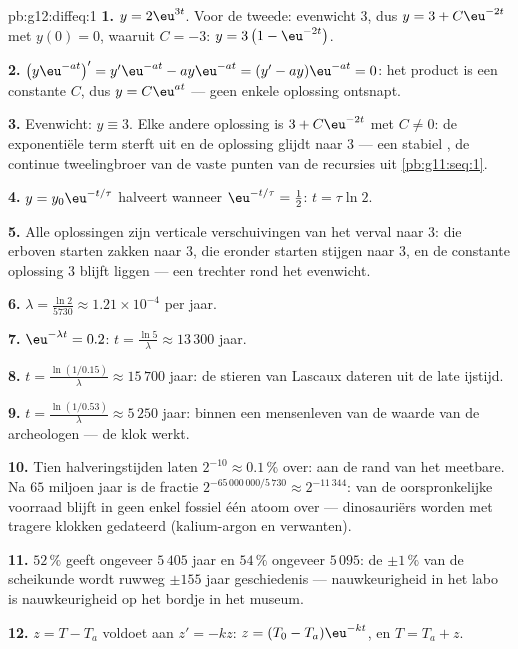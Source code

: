 \begin{solution}{pb:g12:diffeq:1}
\textbf{1.} $y = 2\eu^{3t}$. Voor de tweede: evenwicht $3$, dus
$y = 3 + C\eu^{-2t}$ met $y(0) = 0$, waaruit $C = -3$:
$y = 3\left(1 - \eu^{-2t}\right)$.

\textbf{2.} $\left(y\eu^{-at}\right)' = y'\eu^{-at} - ay\eu^{-at} =
(y' - ay)\eu^{-at} = 0$: het product is een constante $C$, dus
$y = C\eu^{at}$ --- geen enkele oplossing ontsnapt.

\textbf{3.} Evenwicht: $y \equiv 3$. Elke andere oplossing is
$3 + C\eu^{-2t}$ met $C \neq 0$: de exponentiële term sterft uit en de
oplossing glijdt naar $3$ --- een stabiel , de continue tweelingbroer
van de vaste punten van de recursies uit \cref{pb:g11:seq:1}.

\textbf{4.} $y = y_0\eu^{-t/\tau}$ halveert wanneer $\eu^{-t/\tau} =
\frac12$: $t = \tau\ln 2$.

\textbf{5.} Alle oplossingen zijn verticale verschuivingen van het verval
naar $3$: die erboven starten zakken naar $3$, die eronder starten stijgen
naar $3$, en de constante oplossing $3$ blijft liggen --- een trechter rond
het evenwicht.

\textbf{6.} $\lambda = \frac{\ln 2}{5730} \approx 1.21 \times 10^{-4}$ per
jaar.

\textbf{7.} $\eu^{-\lambda t} = 0.2$: $t = \frac{\ln 5}{\lambda} \approx
13\,300$ jaar.

\textbf{8.} $t = \frac{\ln(1/0.15)}{\lambda} \approx 15\,700$ jaar: de
stieren van Lascaux dateren uit de late ijstijd.

\textbf{9.} $t = \frac{\ln(1/0.53)}{\lambda} \approx 5\,250$ jaar: binnen
een mensenleven van de waarde van de archeologen --- de klok werkt.

\textbf{10.} Tien halveringstijden laten $2^{-10} \approx 0.1\,\%$ over: aan
de rand van het meetbare. Na $65$ miljoen jaar is de fractie
$2^{-65\,000\,000/5\,730} \approx 2^{-11\,344}$: van de oorspronkelijke
voorraad blijft in geen enkel fossiel één atoom over --- dinosauriërs worden
met tragere klokken gedateerd (kalium-argon en verwanten).

\textbf{11.} $52\,\%$ geeft ongeveer $5\,405$ jaar en $54\,\%$ ongeveer
$5\,095$: de $\pm 1\,\%$ van de scheikunde wordt ruwweg $\pm 155$ jaar
geschiedenis --- nauwkeurigheid in het labo is nauwkeurigheid op het bordje
in het museum.

\textbf{12.} $z = T - T_a$ voldoet aan $z' = -kz$:
$z = (T_0 - T_a)\eu^{-kt}$, en $T = T_a + z$.


\end{solution}
